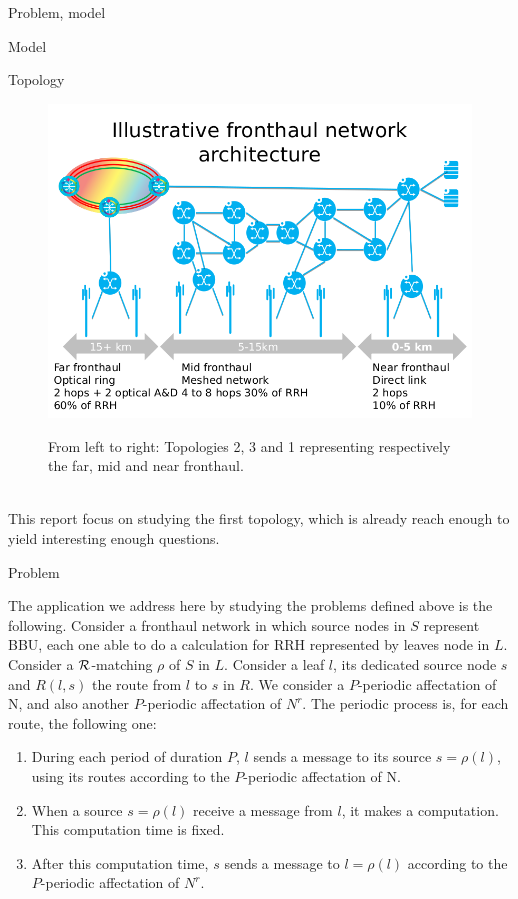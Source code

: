 \documentclass[a4paper,10pt]{report}
\begin{document}
\begin{chapter}{Problem, model}
\begin{section}{Model}
\begin{subsection}{Topology}
{{\begin{figure}[H]
\begin{center}
\includegraphics[scale=0.4]{fronthaul0.png}\\

\end{center}
\caption{From left to right: Topologies 2, 3 and 1 representing respectively the far, mid and near fronthaul.}
\end{figure}
}}\\

This report focus on studying the first topology, which is already reach enough to yield interesting enough questions.

\end{subsection}

\end{section}
\begin{section}{Problem}
   
The application we address here by studying the problems defined above is the following. Consider a fronthaul network in which source nodes in $S$ represent BBU,
each one able to do a calculation for RRH represented by leaves node in $L$. Consider a ${\cal R}$-matching $\rho$ of $S$ in $L$. Consider a leaf $l$, its dedicated source node $s$
and $R(l,s)$ the route from $l$ to $s$ in $R$. We consider a $P$-periodic affectation of N, and also another $P$-periodic affectation of $N^{r}$.
The periodic process is, for each route, the following one:
\begin{enumerate}
 \item During each period of duration $P$, $l$ sends a message to its source $s=\rho(l)$, using its routes according to the $P$-periodic affectation of N. 
 \item When a source $s=\rho(l)$ receive a message from $l$, it makes a computation. This computation time is fixed.
 \item After this computation time, $s$ sends a message to $l=\rho(l)$ according to the $P$-periodic affectation of $N^{r}$.
\end{enumerate}


\end{section}
\end{chapter}
\end{document}
